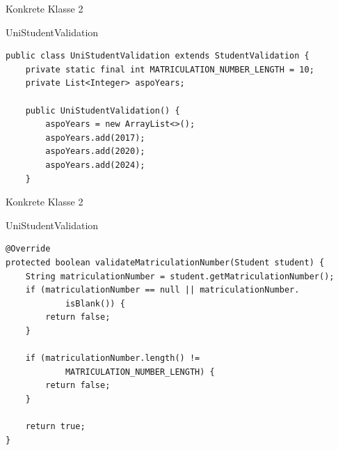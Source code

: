 \begin{frame}[fragile]{Konkrete Klasse 2}
	\begin{exampleblock}{UniStudentValidation}
 		\begin{lstlisting}
public class UniStudentValidation extends StudentValidation {
	private static final int MATRICULATION_NUMBER_LENGTH = 10;
	private List<Integer> aspoYears;
	
	public UniStudentValidation() {
		aspoYears = new ArrayList<>();
		aspoYears.add(2017);
		aspoYears.add(2020);
		aspoYears.add(2024);
	}
 		\end{lstlisting}
 	\end{exampleblock}
\end{frame}

\begin{frame}[fragile]{Konkrete Klasse 2}
	\begin{exampleblock}{UniStudentValidation}
 		\begin{lstlisting}
@Override
protected boolean validateMatriculationNumber(Student student) {
    String matriculationNumber = student.getMatriculationNumber();
    if (matriculationNumber == null || matriculationNumber.
            isBlank()) {
        return false;
    }
    
    if (matriculationNumber.length() != 
            MATRICULATION_NUMBER_LENGTH) {
        return false;
    }
    
    return true;
}
 		\end{lstlisting}
 	\end{exampleblock}
\end{frame}



